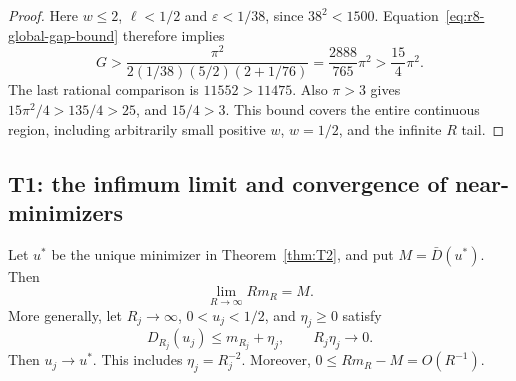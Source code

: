 \begin{proof}
Here $w\le2$, $\ell<1/2$ and $\varepsilon<1/38$, since $38^2<1500$.
Equation~\eqref{eq:r8-global-gap-bound} therefore implies
\[
 G>\frac{\pi^2}{2(1/38)(5/2)(2+1/76)}
   =\frac{2888}{765}\pi^2>\frac{15}{4}\pi^2.
\]
The last rational comparison is $11552>11475$.
Also $\pi>3$ gives $15\pi^2/4>135/4>25$, and $15/4>3$.
This bound covers the entire continuous region, including arbitrarily
small positive $w$, $w=1/2$, and the infinite $R$ tail.
\end{proof}

\subsection{T1: the infimum limit and convergence of near-minimizers}

\begin{theorem}\label{thm:T1}
Let $u^*$ be the unique minimizer in Theorem~\ref{thm:T2}, and put
$M=\bar D(u^*)$. Then
\[
 \lim_{R\to\infty} Rm_R=M.
\]
More generally, let $R_j\to\infty$, $0<u_j<1/2$, and $\eta_j\ge0$
satisfy
\[
 D_{R_j}(u_j)\le m_{R_j}+\eta_j,
 \qquad R_j\eta_j\longrightarrow0.
\]
Then $u_j\to u^*$. This includes $\eta_j=R_j^{-2}$.
Moreover, $0\le Rm_R-M=O(R^{-1})$.
\end{theorem}

